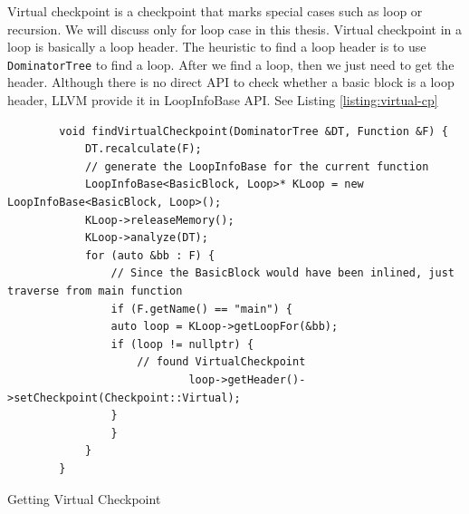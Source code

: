 Virtual checkpoint is a checkpoint that marks special cases such as loop or recursion. We will discuss only for loop case in this
thesis. Virtual checkpoint in a loop is basically a loop header. The heuristic to find a loop header is to use \texttt{DominatorTree} to find 
a loop. After we find a loop, then we just need to get the header. 
Although there is no direct API to check whether a basic block is a loop header, LLVM provide it in LoopInfoBase API. See Listing \ref{listing:virtual-cp}

\begin{listing}[htbp]
    \begin{verbatim}
        void findVirtualCheckpoint(DominatorTree &DT, Function &F) {
            DT.recalculate(F);
            // generate the LoopInfoBase for the current function
            LoopInfoBase<BasicBlock, Loop>* KLoop = new LoopInfoBase<BasicBlock, Loop>();
            KLoop->releaseMemory();
            KLoop->analyze(DT);
            for (auto &bb : F) {
                // Since the BasicBlock would have been inlined, just traverse from main function
                if (F.getName() == "main") {
                auto loop = KLoop->getLoopFor(&bb);
                if (loop != nullptr) {
                    // found VirtualCheckpoint
                            loop->getHeader()->setCheckpoint(Checkpoint::Virtual);
                }
                }
            }
        }
    \end{verbatim}
    \caption{Getting Virtual Checkpoint}
    \label{listing:virtual-cp}
\end{listing}



